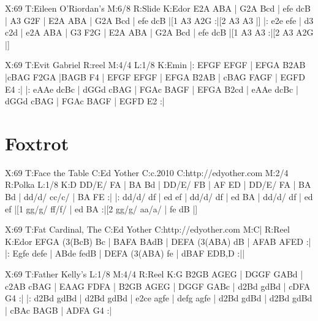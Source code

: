 \documentclass[letterpaper]{article}
\begin{document}
\begin{abc}[name]
X:69
T:Eileen O'Riordan's
M:6/8
R:Slide
K:Edor
E2A ABA | G2A Bcd | efe dcB | A3 G2F |
E2A ABA | G2A Bcd | efe dcB |[1 A3 A2G :|[2 A3 A3 |]
|: e2e efe | d3 c2d | e2A ABA | G3 F2G |
E2A ABA | G2A Bcd | efe dcB |[1 A3 A3 :|[2 A3 A2G |]
\end{abc}

\begin{abc}[name]
X:69
T:Evit Gabriel
R:reel
M:4/4
L:1/8
K:Emin
|: EFGF EFGF | EFGA B2AB |cBAG F2GA |BAGB F4 |
EFGF EFGF | EFGA B2AB | cBAG FAGF | EGFD E4 :|
|: eAAe dcBc | dGGd cBAG | FGAc BAGF | EFGA B2cd |
eAAe dcBc | dGGd cBAG | FGAc BAGF | EGFD E2 :|
\end{abc}

\section{Foxtrot}
\begin{abc}[name]
X:69
T:Face the Table
C:Ed Yother
C:c.2010
C:http://edyother.com
M:2/4
R:Polka
L:1/8
K:D
DD/E/ FA | BA Bd | DD/E/ FB | AF ED |
DD/E/ FA | BA Bd | dd/d/ cc/c/ | BA FE :|
|: dd/d/ df | ed ef | dd/d/ df | ed BA |
dd/d/ df | ed ef |[1 gg/g/ ff/f/ | ed BA :|[2 gg/g/ aa/a/ | fe dB |]
\end{abc}

\begin{abc}[name]
X:69
T:Fat Cardinal, The
C:Ed Yother
C:http://edyother.com
M:C|
R:Reel
K:Edor
EFGA (3(BcB) Bc | BAFA BAdB | DEFA (3(ABA) dB | AFAB AFED :|
|: Egfe defe | ABde fedB | DEFA (3(ABA) fe | dBAF EDB,D :||
\end{abc}

\begin{abc}[name]
X:69
T:Father Kelly's
L:1/8
M:4/4
R:Reel
K:G
B2GB AGEG | DGGF GABd | c2AB cBAG | EAAG FDFA |
B2GB AGEG | DGGF GABc | d2Bd gdBd | cDFA G4 :|
|: d2Bd gdBd | d2Bd gdBd | e2ce agfe | defg agfe |
d2Bd gdBd | d2Bd gdBd | cBAc BAGB | ADFA G4 :|
\end{abc}
\end{document}
